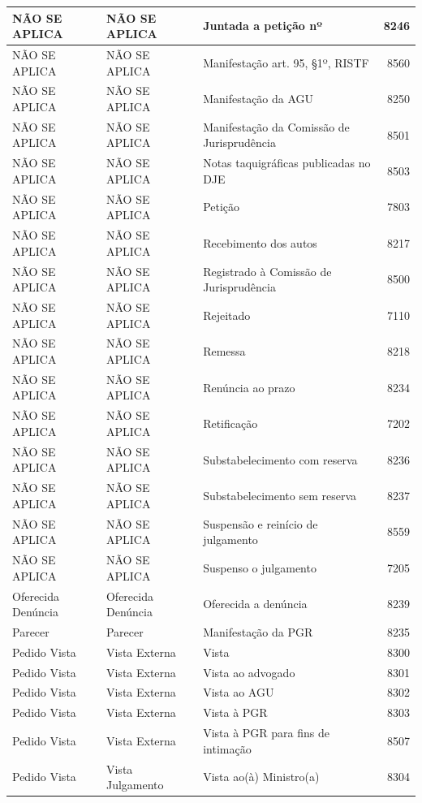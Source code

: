 \documentclass[
]{book}
\begin{document}
\begin{tabular}{l|l|l|r}
\hline
NÃO SE APLICA & NÃO SE APLICA & Juntada a petição nº & 8246\\
\hline
NÃO SE APLICA & NÃO SE APLICA & Manifestação art. 95, §1º, RISTF & 8560\\
\hline
NÃO SE APLICA & NÃO SE APLICA & Manifestação da AGU & 8250\\
\hline
NÃO SE APLICA & NÃO SE APLICA & Manifestação da Comissão de Jurisprudência & 8501\\
\hline
NÃO SE APLICA & NÃO SE APLICA & Notas taquigráficas publicadas no DJE & 8503\\
\hline
NÃO SE APLICA & NÃO SE APLICA & Petição & 7803\\
\hline
NÃO SE APLICA & NÃO SE APLICA & Recebimento dos autos & 8217\\
\hline
NÃO SE APLICA & NÃO SE APLICA & Registrado à Comissão de Jurisprudência & 8500\\
\hline
NÃO SE APLICA & NÃO SE APLICA & Rejeitado & 7110\\
\hline
NÃO SE APLICA & NÃO SE APLICA & Remessa & 8218\\
\hline
NÃO SE APLICA & NÃO SE APLICA & Renúncia ao prazo & 8234\\
\hline
NÃO SE APLICA & NÃO SE APLICA & Retificação & 7202\\
\hline
NÃO SE APLICA & NÃO SE APLICA & Substabelecimento com reserva & 8236\\
\hline
NÃO SE APLICA & NÃO SE APLICA & Substabelecimento sem reserva & 8237\\
\hline
NÃO SE APLICA & NÃO SE APLICA & Suspensão e reinício de julgamento & 8559\\
\hline
NÃO SE APLICA & NÃO SE APLICA & Suspenso o julgamento & 7205\\
\hline
Oferecida Denúncia & Oferecida Denúncia & Oferecida a denúncia & 8239\\
\hline
Parecer & Parecer & Manifestação da PGR & 8235\\
\hline
Pedido Vista & Vista Externa & Vista & 8300\\
\hline
Pedido Vista & Vista Externa & Vista ao advogado & 8301\\
\hline
Pedido Vista & Vista Externa & Vista ao AGU & 8302\\
\hline
Pedido Vista & Vista Externa & Vista à PGR & 8303\\
\hline
Pedido Vista & Vista Externa & Vista à PGR para fins de intimação & 8507\\
\hline
Pedido Vista & Vista Julgamento & Vista ao(à) Ministro(a) & 8304\\

\end{tabular}
\end{document}
